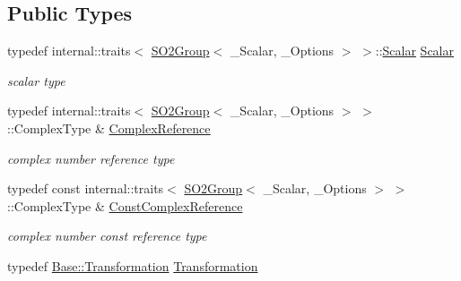 \subsection*{Public Types}
\begin{DoxyCompactItemize}
\item 
typedef internal\+::traits$<$ \hyperlink{class_sophus_1_1_s_o2_group}{S\+O2\+Group}$<$ \+\_\+\+Scalar, \+\_\+\+Options $>$ $>$\+::\hyperlink{class_sophus_1_1_s_o2_group_a752943ea935a3007be93245ddd16bc74}{Scalar} \hyperlink{class_sophus_1_1_s_o2_group_a752943ea935a3007be93245ddd16bc74}{Scalar}\hypertarget{class_sophus_1_1_s_o2_group_a752943ea935a3007be93245ddd16bc74}{}\label{class_sophus_1_1_s_o2_group_a752943ea935a3007be93245ddd16bc74}

\begin{DoxyCompactList}\small\item\em scalar type \end{DoxyCompactList}\item 
typedef internal\+::traits$<$ \hyperlink{class_sophus_1_1_s_o2_group}{S\+O2\+Group}$<$ \+\_\+\+Scalar, \+\_\+\+Options $>$ $>$\+::Complex\+Type \& \hyperlink{class_sophus_1_1_s_o2_group_a2dc36b32ca3cec6727367d586d3263c6}{Complex\+Reference}\hypertarget{class_sophus_1_1_s_o2_group_a2dc36b32ca3cec6727367d586d3263c6}{}\label{class_sophus_1_1_s_o2_group_a2dc36b32ca3cec6727367d586d3263c6}

\begin{DoxyCompactList}\small\item\em complex number reference type \end{DoxyCompactList}\item 
typedef const internal\+::traits$<$ \hyperlink{class_sophus_1_1_s_o2_group}{S\+O2\+Group}$<$ \+\_\+\+Scalar, \+\_\+\+Options $>$ $>$\+::Complex\+Type \& \hyperlink{class_sophus_1_1_s_o2_group_a7d6e7964e8be6e4a79a6873382d2c996}{Const\+Complex\+Reference}\hypertarget{class_sophus_1_1_s_o2_group_a7d6e7964e8be6e4a79a6873382d2c996}{}\label{class_sophus_1_1_s_o2_group_a7d6e7964e8be6e4a79a6873382d2c996}

\begin{DoxyCompactList}\small\item\em complex number const reference type \end{DoxyCompactList}\item 
typedef \hyperlink{class_sophus_1_1_s_o2_group_base_a8981dccaf65802191e989815046b6a82}{Base\+::\+Transformation} \hyperlink{class_sophus_1_1_s_o2_group_a27d15c5fed370e583c258baf1abe8c62}{Transformation}\hypertarget{class_sophus_1_1_s_o2_group_a27d15c5fed370e583c258baf1abe8c62}{}\label{class_sophus_1_1_s_o2_group_a27d15c5fed370e583c258baf1abe8c62}


\end{DoxyCompactItemize}
